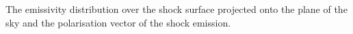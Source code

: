 \label{knot-polarisation}{The emissivity distribution over the shock surface projected onto the plane of the sky and the polarisation vector of the shock emission. 
}
